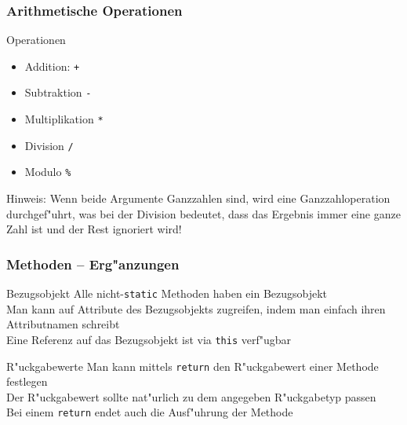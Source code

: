 \documentclass{beamer}
\begin{document}
\begin{frame}
\frametitle{Arithmetische Operationen}
\begin{block}{Operationen}
\begin{itemize}
\item Addition: \texttt{+}\\
\item Subtraktion \texttt{-}\\
\item Multiplikation \texttt{*}\\
\item Division \texttt{/}\\
\item Modulo \texttt{\%}
\end{itemize}
Hinweis: Wenn beide Argumente Ganzzahlen sind, wird eine Ganzzahloperation durchgef"uhrt, was bei der Division bedeutet, dass das Ergebnis immer eine ganze Zahl ist und der Rest ignoriert wird!
\end{block}
\end{frame}


\begin{frame}
\frametitle{Methoden -- Erg"anzungen}
\begin{block}{Bezugsobjekt}
Alle nicht-\texttt{static} Methoden haben ein Bezugsobjekt\\
Man kann auf Attribute des Bezugsobjekts zugreifen, indem man einfach ihren Attributnamen schreibt\\
Eine Referenz auf das Bezugsobjekt ist via \texttt{this} verf"ugbar
\end{block}

\begin{block}{R"uckgabewerte}
Man kann mittels \texttt{return} den R"uckgabewert einer Methode festlegen\\
Der R"uckgabewert sollte nat"urlich zu dem angegeben R"uckgabetyp passen\\
Bei einem \texttt{return} endet auch die Ausf"uhrung der Methode
\end{block}
\end{frame}
\end{document}
